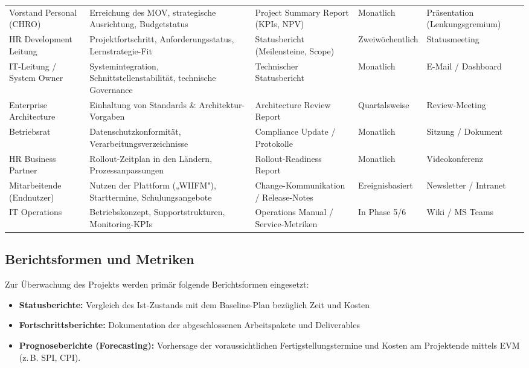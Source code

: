{\begin{xltabular}{\textwidth}{@{}>{\hsize}X>{\hsize}X>{\hsize}X>{\hsize}X>{\hsize}X@{}}
            Vorstand Personal (\acs{CHRO})  & Erreichung des \acs{MOV}, strategische Ausrichtung, Budgetstatus     & Project Summary Report (\acp{KPI}, \acs{NPV}) & Monatlich         & Präsentation (Lenkungsgremium)       \\
            \acs{HR} Development Leitung    & Projektfortschritt, Anforderungsstatus, Lernstrategie-Fit            & Statusbericht (Meilensteine, Scope)            & Zweiwöchentlich    & Statusmeeting            \\
            \acs{IT}-Leitung / System Owner & Systemintegration, Schnittstellenstabilität, technische Governance   & Technischer Statusbericht                      & Monatlich         & E-Mail / Dashboard       \\
            Enterprise Architecture         & Einhaltung von Standards \& Architektur-Vorgaben                     & Architecture Review Report                     & Quartalsweise     & Review-Meeting           \\
            Betriebsrat                     & Datenschutzkonformität, Verarbeitungsverzeichnisse                   & Compliance Update / Protokolle                 & Monatlich         & Sitzung / Dokument       \\
            \acs{HR} Business Partner       & Rollout-Zeitplan in den Ländern, Prozessanpassungen                  & Rollout-Readiness Report                       & Monatlich         & Videokonferenz           \\
            Mitarbeitende (Endnutzer)       & Nutzen der Plattform („\ac{WIIFM}"), Starttermine, Schulungsangebote & Change-Kommunikation / Release-Notes           & Ereignisbasiert   & Newsletter / Intranet    \\
            \acs{IT} Operations             & Betriebskonzept, Supportstrukturen, Monitoring-\acp{KPI}            & Operations Manual / Service-Metriken           & In Phase 5/6      & Wiki / MS Teams          \\
        \end{xltabular}}

\subsection{Berichtsformen und Metriken}
Zur Überwachung des Projekts werden primär folgende Berichtsformen eingesetzt:
\begin{itemize}
    \item \textbf{Statusberichte:} Vergleich des Ist-Zustands mit dem Baseline-Plan bezüglich Zeit und Kosten
    \item \textbf{Fortschrittsberichte:} Dokumentation der abgeschlossenen Arbeitspakete und Deliverables
    \item \textbf{Prognoseberichte (Forecasting):} Vorhersage der voraussichtlichen Fertigstellungstermine und Kosten am Projektende mittels \ac{EVM} (z.\,B. \ac{SPI}, \ac{CPI}).
\end{itemize}

